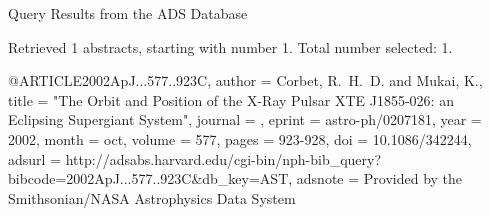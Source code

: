Query Results from the ADS Database


Retrieved 1 abstracts, starting with number 1.  Total number selected: 1.

@ARTICLE{2002ApJ...577..923C,
   author = {{Corbet}, R.~H.~D. and {Mukai}, K.},
    title = "{The Orbit and Position of the X-Ray Pulsar XTE J1855-026: an Eclipsing Supergiant System}",
  journal = {\apj},
   eprint = {astro-ph/0207181},
     year = 2002,
    month = oct,
   volume = 577,
    pages = {923-928},
      doi = {10.1086/342244},
   adsurl = {http://adsabs.harvard.edu/cgi-bin/nph-bib_query?bibcode=2002ApJ...577..923C&db_key=AST},
  adsnote = {Provided by the Smithsonian/NASA Astrophysics Data System}
}


